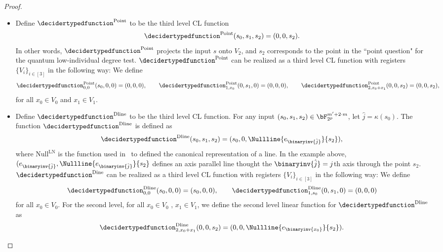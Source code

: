 \begin{proof}
\begin{itemize}
	\item  Define $\decidertypedfunction^{\text{Point}}$ to be the third level CL function
	\begin{equation*}
		\decidertypedfunction^{\text{Point}}(s_0, s_1, s_2) = (0,0,s_2).
	\end{equation*}
	In other words, $\decidertypedfunction^{\text{Point}}$ projects the input $s$ onto $V_2$, and $s_2$ corresponds to the point in the ``point question" for the quantum low-individual degree test. $\decidertypedfunction^{\text{Point}}$ can be realized as a third level CL function with registers $\{V_i\}_{i \in [3]}$ in the following way: We define
	\begin{equation*}
		\decidertypedfunction_{0,0}^{\text{Point}}(s_0,0,0) = (0,0,0), \qquad 	\decidertypedfunction_{1,x_0}^{\text{Point}}(0,s_1,0) = (0,0,0), \qquad \decidertypedfunction_{2,x_0 + x_1}^{\text{Point}}(0,0,s_2) = (0,0,s_2),
	\end{equation*}
	for all $x_0 \in  V_0$ and $x_1 \in V_1$. 
	\item Define $\decidertypedfunction^{\text{Dline}}$ to be the third level CL function. For any input $(s_0, s_1, s_2) \in \bF_{2^p}^{m' + 2 \cdot m}$, let $\hat{j} = \kappa(s_0)$. The function $\decidertypedfunction^{\text{Dline}}$ is defined as
	\begin{equation*}
		\decidertypedfunction^{\text{Dline}}(s_0, s_1, s_2) = (s_0,0,\Nullline{e_{\binaryinv{\hat{j}}}}{s_2} ), 
	\end{equation*}
	where $\text{Null}^{\text{LN}}$ is the function used in~ to defined the canonical representation of a line. In the example above, $(e_{\binaryinv{\hat{j}}},\Nullline{e_{\binaryinv{\hat{j}}}}{s_2}$ defines an axis parallel line thought the $\binaryinv{\hat{j}} = j$th axis through the point $s_2$. $\decidertypedfunction^{\text{Dine}}$ can be realized as a third level CL function with registers $\{V_i\}_{i \in [3]}$ in the following way: We define
	\begin{equation*}
		\decidertypedfunction_{0,0}^{\text{Dline}}(s_0,0,0) = (s_0,0,0), \qquad \decidertypedfunction_{1,s_0}^{\text{Dline}}(0,s_1,0) = (0,0,0)
	\end{equation*}
	for all $x_0 \in V_0$. For the second level, for all $x_0 \in V_0$ , $x_1 \in V_1$, we define the second level linear function for $\decidertypedfunction^{\text{Dline}}$ as
	\begin{equation*}
		\decidertypedfunction_{2, x_0 + x_1}^{\text{Dline}}(0,0, s_2) = (0,0,\Nullline{e_{\binaryinv{x_0}}}{s_2}).

\end{equation*}
\end{itemize}
\end{proof}
